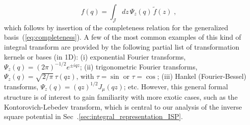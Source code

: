 \documentclass[a4paper,preprint,draft,showpacs,amsmath,amsfonts,amssymb,aps,prd]{revtex4}%
\begin{document}
\begin{equation}
f(q) =
\int_{\mathcal J}
 dz 
\,
\Psi_{z} (q)
 \,
\tilde{f}(z)
\;  ,
\label{eq:generalized_reciprocal_transform}
\end{equation}
which follows by 
insertion of the completeness relation for the generalized basis~(\ref{eq:completeness}).
A few of the most common examples of this
kind of integral transform are provided by the following partial list 
of transformation kernels or bases (in 1D):
(i) exponential Fourier transforms, $\Psi_{z}(q)= (2\pi)^{-1/2} e^{\pm iqz}$;
(ii) trigonometric Fourier transforms, $\Psi_{z}(q) = \sqrt{2/\pi}
\, \tau (qz)$,
with $\tau = \sin$ or $\tau = \cos$;
(iii)
Hankel (Fourier-Bessel) transforms,
$\Psi_{z}(q) = (qz)^{1/2} J_{\mu}(qz)$; etc.
However, this general formal structure is of interest
to gain familiarity with more exotic cases, such as the
Kontorovich-Lebedev transform, which
 is central to our analysis of the inverse square potential in 
Sec~.\ref{sec:integral_representation_ISP}.
\end{document}
